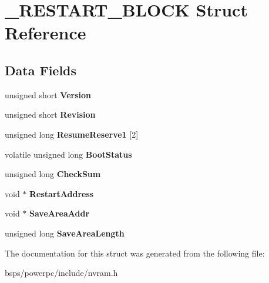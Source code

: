 \hypertarget{struct__RESTART__BLOCK}{}\section{\+\_\+\+R\+E\+S\+T\+A\+R\+T\+\_\+\+B\+L\+O\+CK Struct Reference}
\label{struct__RESTART__BLOCK}
\subsection*{Data Fields}
\begin{DoxyCompactItemize}
\item 
\mbox{\label{struct__RESTART__BLOCK_a26833e20ede3042a315b7cbd8f4d74e1}} 
unsigned short {\bfseries Version}
\item 
\mbox{\label{struct__RESTART__BLOCK_a41d4aae07387b5a7924c6dcce6dd0af3}} 
unsigned short {\bfseries Revision}
\item 
\mbox{\label{struct__RESTART__BLOCK_a1a1c9b170f699d19c0b975da60f8b4fc}} 
unsigned long {\bfseries Resume\+Reserve1} \mbox{[}2\mbox{]}
\item 
\mbox{\label{struct__RESTART__BLOCK_a0c601c9765058e62e956fd33cb992e8d}} 
volatile unsigned long {\bfseries Boot\+Status}
\item 
\mbox{\label{struct__RESTART__BLOCK_aa88310e132fadb70bb58c10a19307893}} 
unsigned long {\bfseries Check\+Sum}
\item 
\mbox{\label{struct__RESTART__BLOCK_ab36870dfbccdfe06ebec3beb763e8300}} 
void $\ast$ {\bfseries Restart\+Address}
\item 
\mbox{\label{struct__RESTART__BLOCK_a27b4cdb6d173e97bce40f0165dd9cda9}} 
void $\ast$ {\bfseries Save\+Area\+Addr}
\item 
\mbox{\label{struct__RESTART__BLOCK_a4539778bf806bc0064dd170d105f95c5}} 
unsigned long {\bfseries Save\+Area\+Length}
\end{DoxyCompactItemize}


The documentation for this struct was generated from the following file\+:\begin{DoxyCompactItemize}
\item 
bsps/powerpc/include/nvram.\+h\end{DoxyCompactItemize}
